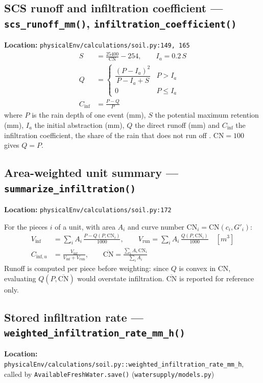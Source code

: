 \documentclass[11pt]{article}
\newcommand{\code}[1]{\texttt{#1}}
\begin{document}
\subsection{SCS runoff and infiltration coefficient --- \code{scs\_runoff\_mm()}, \code{infiltration\_coefficient()}}
\textbf{Location:} \code{physicalEnv/calculations/soil.py:149, 165}
\begin{align}
  S &= \frac{25400}{\mathrm{CN}} - 254, \qquad I_a = 0.2\,S \\
  Q &= \begin{cases} \dfrac{(P - I_a)^2}{P - I_a + S} & P > I_a \\[4pt] 0 & P \le I_a \end{cases} \\
  C_{\text{inf}} &= \frac{P - Q}{P}
\end{align}
where $P$ is the rain depth of one event (\si{mm}), $S$ the potential maximum retention (\si{mm}), $I_a$ the initial abstraction (\si{mm}), $Q$ the direct runoff (\si{mm}) and $C_{\text{inf}}$ the infiltration coefficient, the share of the rain that does not run off \cite{NEH630ch10}. $\mathrm{CN} = 100$ gives $Q = P$.

\subsection{Area-weighted unit summary --- \code{summarize\_infiltration()}}
\label{sec:scs-summary}
\textbf{Location:} \code{physicalEnv/calculations/soil.py:172}

For the pieces $i$ of a unit, with area $A_i$ and curve number $\mathrm{CN}_i = \mathrm{CN}(c_i, G'_i)$:
\begin{align}
  V_{\text{inf}} &= \sum_i A_i \,\frac{P - Q(P, \mathrm{CN}_i)}{1000}, \qquad
  V_{\text{run}} = \sum_i A_i \,\frac{Q(P, \mathrm{CN}_i)}{1000} \quad [\si{m^3}] \\
  C_{\text{inf},u} &= \frac{V_{\text{inf}}}{V_{\text{inf}} + V_{\text{run}}}, \qquad
  \overline{\mathrm{CN}} = \frac{\sum_i A_i\, \mathrm{CN}_i}{\sum_i A_i}
\end{align}
Runoff is computed per piece before weighting: since $Q$ is convex in CN, evaluating $Q(P, \overline{\mathrm{CN}})$ would overstate infiltration. $\overline{\mathrm{CN}}$ is reported for reference only.

\subsection{Stored infiltration rate --- \code{weighted\_infiltration\_rate\_mm\_h()}}
\label{sec:infiltration-rate}
\textbf{Location:} \code{physicalEnv/calculations/soil.py::weighted\_infiltration\_rate\_mm\_h}, called by \code{AvailableFreshWater.save()} (\code{watersupply/models.py})
\end{document}
